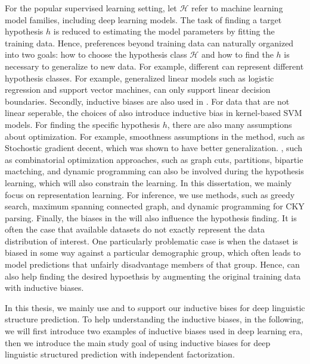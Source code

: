 For the popular supervised learning setting, let $\mathcal{H}$ refer
to machine learning model families, including deep learning
models. The task of finding a target hypothesis $h$ is reduced to
estimating the model parameters by fitting the training data. Hence,
preferences beyond training data can naturally organized into two
goals: how to choose the hypothesis class $\mathcal{H}$ and how to
find the $h$ is necessary to generalize to new data. For example,
different  can represent different hypothesis
classes. For example, generalized linear models such as logistic
regression and support vector machines, can only support linear
decision boundaries.  Secondly, inductive biases are also used in
. For data that are not linear seperable, the
choices of  also introduce inductive bias in
kernel-based SVM models. For finding the specific hypothesis $h$,
there are also many assumptions about optimization. For example,
smoothness assumptions in the  method, such as
Stochostic gradient decent, which was shown to have better
generalization.  , such as combinatorial
optimization approaches, such as graph cuts, partitions, bipartie
mactching, and dynamic programming can also be involved during the
hypothesis learning, which will also constrain the learning. In this
dissertation, we mainly focus on representation learning. For
inference, we use methods, such as greedy search, maximum spanning
connected graph, and dynamic programming for CKY parsing. Finally, the
biases in the  will also influence the hypothesis
finding. It is often the case that available datasets do not exactly
represent the data distribution of interest.  One particularly
problematic case is when the dataset is biased in some way against a
particular demographic group, which often leads to model predictions
that unfairly disadvantage members of that group. Hence,  can also help finding the desired hypoethsis by
augmenting the original training data with inductive biases.

In this thesis, we mainly use  and  to support our inductive bises for deep linguistic
structure prediction. To help understanding the inductive biases, in
the following, we will first introduce two examples of inductive
biases used in deep learning era, then we introduce the main study
goal of using inductive biases for deep linguistic structured
prediction with independent factorization.

